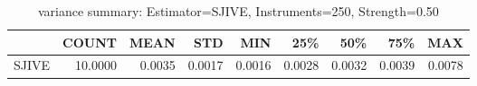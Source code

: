 \begin{table}[ht]
\centering
\caption{variance summary: Estimator=SJIVE, Instruments=250, Strength=0.50}
\begin{tabular}{lrrrrrrrr}
\toprule
 & COUNT & MEAN & STD & MIN & 25\% & 50\% & 75\% & MAX \\
\midrule
SJIVE & 10.0000 & 0.0035 & 0.0017 & 0.0016 & 0.0028 & 0.0032 & 0.0039 & 0.0078 \\
\bottomrule
\end{tabular}
\end{table}
